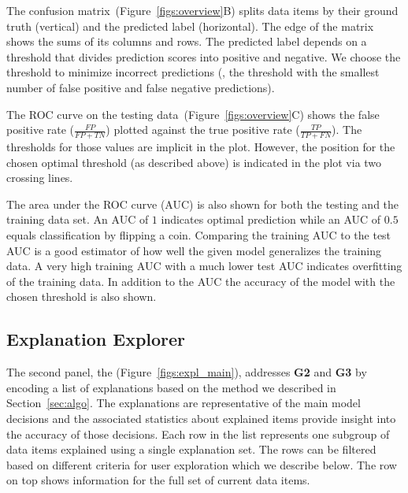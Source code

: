 The confusion matrix~(Figure~\ref{figs:overview}B) splits data items by their ground truth (vertical) and the predicted label (horizontal).
The edge of the matrix shows the sums of its columns and rows.
The predicted label depends on a threshold that divides prediction scores into positive and negative.
We choose the threshold to minimize incorrect predictions (\ie, the threshold with the smallest number of false positive and false negative predictions).



The ROC curve on the testing data~(Figure~\ref{figs:overview}C)
shows the false positive rate ($\frac{FP}{FP + TN}$) plotted against the true positive rate ($\frac{TP}{TP + FN}$).
The thresholds for those values are implicit in the plot.
However, the position for the chosen optimal threshold (as described above) is indicated in the plot via two crossing lines.

The area under the ROC curve (AUC) is also shown for both the testing and the training data set.
An AUC of $1$ indicates optimal prediction while an AUC of $0.5$ equals classification by flipping a coin.
Comparing the training AUC to the test AUC is a good estimator of how well the given model generalizes the training data.
A very high training AUC with a much lower test AUC indicates overfitting of the training data.
In addition to the AUC the accuracy of the model with the chosen threshold is also shown.

\subsection{Explanation Explorer}

The second panel, the \tabB (Figure~\ref{figs:expl_main}),  addresses \textbf{G2} and \textbf{G3} by encoding a list of explanations based on the method we described in Section~\ref{sec:algo}. The explanations are representative of the main model decisions and the associated statistics about explained items provide insight into the accuracy of those decisions.
Each row in the list represents one subgroup of data items explained using a single explanation set.
The rows can be filtered based on different criteria for user exploration which we describe below.
The row on top shows information for the full set of current data items.

